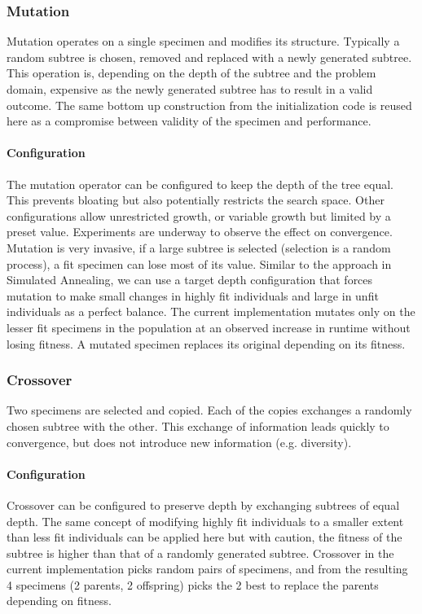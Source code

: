 \documentclass[10pt]{extarticle}
\begin{document}
\subsubsection{Mutation}
Mutation operates on a single specimen and modifies its structure. Typically a random subtree is chosen, removed and replaced with a newly generated subtree. 
This operation is, depending on the depth of the subtree and the problem domain, expensive as the newly generated subtree has to result in a valid outcome. The same bottom up construction from the initialization code is reused here as a compromise between validity of the specimen and performance.
\paragraph{Configuration}
The mutation operator can be configured to keep the depth of the tree equal. This prevents bloating but also potentially restricts the search space.
Other configurations allow unrestricted growth, or variable growth but limited by a preset value. Experiments are underway to observe the effect on convergence.
Mutation is very invasive, if a large subtree is selected (selection is a random process), a fit specimen can lose most of its value.
Similar to the approach in Simulated Annealing, we can use a target depth configuration that forces mutation to make small changes in highly fit individuals and large in unfit individuals as a perfect balance.
The current implementation mutates only on the lesser fit specimens in the population at an observed increase in runtime without losing fitness.
A mutated specimen replaces its original depending on its fitness.

\subsubsection{Crossover}
Two specimens are selected and copied. Each of the copies exchanges a randomly chosen subtree with the other. This exchange of information leads quickly to convergence, but does not introduce new information (e.g. diversity). 
\paragraph{Configuration}
Crossover can be configured to preserve depth by exchanging subtrees of equal depth. The same concept of modifying highly fit individuals to a smaller extent than less fit individuals can be applied here but with caution, the fitness of the subtree is higher than that of a randomly generated subtree.
Crossover in the current implementation picks random pairs of specimens, and from the resulting 4 specimens (2 parents, 2 offspring) picks the 2 best to replace the parents depending on fitness.
\end{document}
